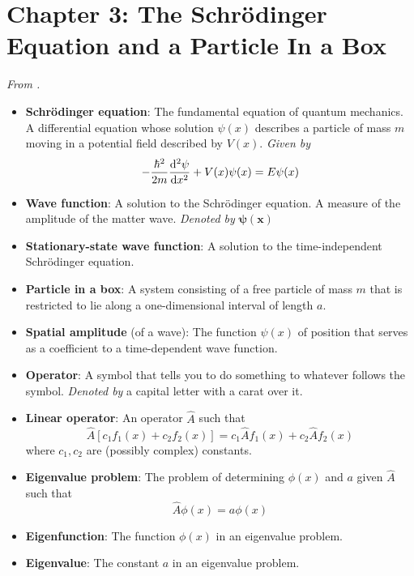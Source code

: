 \documentclass[../notes.tex]{subfiles}
\begin{document}
\section{Chapter 3: The Schr\"{o}dinger Equation and a Particle In a Box}
\emph{From \textcite{bib:McQuarrieSimon}.}
\begin{itemize}
    \item \textbf{Schr\"{o}dinger equation}: The fundamental equation of quantum mechanics. A differential equation whose solution $\psi(x)$ describes a particle of mass $m$ moving in a potential field described by $V(x)$. \emph{Given by}
    \begin{equation*}
        -\frac{\hbar^2}{2m}\dv[2]{\psi}{x}+V(x)\psi(x) = E\psi(x)
    \end{equation*}
    \item \textbf{Wave function}: A solution to the Schr\"{o}dinger equation. A measure of the amplitude of the matter wave. \emph{Denoted by} $\bm{\psi(x)}$
    \item \textbf{Stationary-state wave function}: A solution to the time-independent Schr\"{o}dinger equation.
    \item \textbf{Particle in a box}: A system consisting of a free particle of mass $m$ that is restricted to lie along a one-dimensional interval of length $a$.
    \item \textbf{Spatial amplitude} (of a wave): The function $\psi(x)$ of position that serves as a coefficient to a time-dependent wave function.
    \item \textbf{Operator}: A symbol that tells you to do something to whatever follows the symbol. \emph{Denoted by} a capital letter with a carat over it.
    \item \textbf{Linear operator}: An operator $\hat{A}$ such that
    \begin{equation*}
        \hat{A}[c_1f_1(x)+c_2f_2(x)] = c_1\hat{A}f_1(x)+c_2\hat{A}f_2(x)
    \end{equation*}
    where $c_1,c_2$ are (possibly complex) constants.
    \item \textbf{Eigenvalue problem}: The problem of determining $\phi(x)$ and $a$ given $\hat{A}$ such that
    \begin{equation*}
        \hat{A}\phi(x) = a\phi(x)
    \end{equation*}
    \item \textbf{Eigenfunction}: The function $\phi(x)$ in an eigenvalue problem.
    \item \textbf{Eigenvalue}: The constant $a$ in an eigenvalue problem.

\end{itemize}
\end{document}
